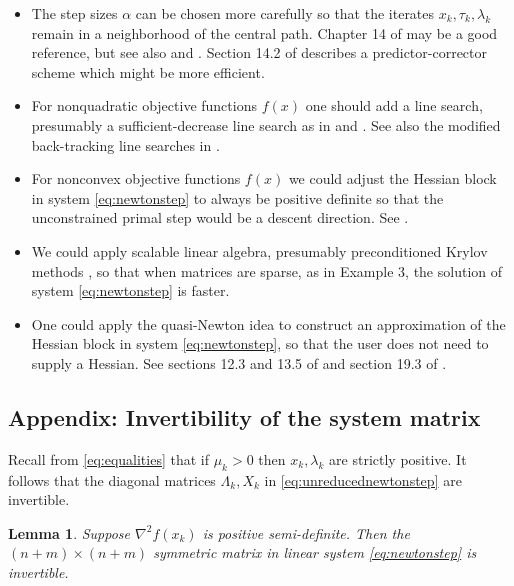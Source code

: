 \documentclass[11pt]{article}
\newcommand{\grad}{\nabla}
\begin{document}
\begin{itemize}
\item The step sizes $\alpha$ can be chosen more carefully so that the iterates $x_k,\tau_k,\lambda_k$ remain in a neighborhood of the central path.  Chapter 14 of \cite{NocedalWright2006} may be a good reference, but see also \cite{YamashitaYabe1996} and \cite{ZhangTapiaDennis1992}.  Section 14.2 of \cite{NocedalWright2006} describes a predictor-corrector scheme which might be more efficient.
\item For nonquadratic objective functions $f(x)$ one should add a line search, presumably a sufficient-decrease line search as in \cite[section 11.5]{GrivaNashSofer2009} and \cite[sections 19.3, 19.4]{NocedalWright2006}.  See also the modified back-tracking line searches in \cite{BensonMunson2006}.
\item For nonconvex objective functions $f(x)$ we could adjust the Hessian block in system \eqref{eq:newtonstep} to always be positive definite so that the unconstrained primal step would be a descent direction.  See \cite[section 11.4]{GrivaNashSofer2009}.
\item We could apply scalable linear algebra, presumably preconditioned Krylov methods \cite{Bueler2021}, so that when matrices are sparse, as in Example 3, the solution of system \eqref{eq:newtonstep} is faster.
\item One could apply the quasi-Newton idea to construct an approximation of the Hessian block in system \eqref{eq:newtonstep}, so that the user does not need to supply a Hessian.  See sections 12.3 and 13.5 of \cite{GrivaNashSofer2009} and section 19.3 of \cite{NocedalWright2006}.
\end{itemize}


\medskip




\appendix
\subsection*{Appendix: Invertibility of the system matrix}

\newtheorem*{lemma}{Lemma}
\newtheorem*{corollary}{Corollary}

Recall from \eqref{eq:equalities} that if $\mu_k>0$ then $x_k,\lambda_k$ are strictly positive.  It follows that the diagonal matrices $\Lambda_k,X_k$ in \eqref{eq:unreducednewtonstep} are invertible.

\begin{lemma}
Suppose $\grad^2 f(x_k)$ is positive semi-definite.  Then the $(n+m)\times (n+m)$ symmetric matrix in linear system \eqref{eq:newtonstep} is invertible.
\end{lemma}
\end{document}
